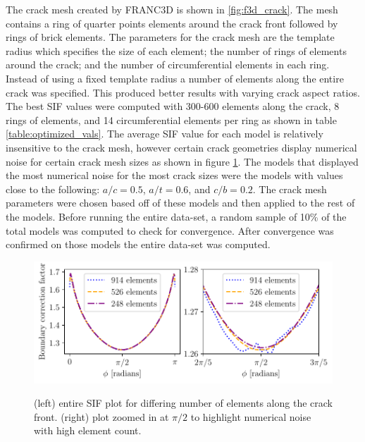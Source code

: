The crack mesh created by FRANC3D is shown in \ref{fig:f3d_crack}. The mesh contains a ring of quarter points elements around the crack front followed by rings of brick elements. The parameters for the crack mesh are the template radius which specifies the size of each element; the number of rings of elements around the crack; and the number of circumferential elements in each ring. Instead of using a fixed template radius a number of elements along the entire crack was specified. This produced better results with varying crack aspect ratios. The best SIF values were computed with 300-600 elements along the crack, 8 rings of elements, and 14 circumferential elements per ring as shown in table \ref{table:optimized_vals}. The average SIF value for each model is relatively insensitive to the crack mesh, however certain crack geometries display numerical noise for certain crack mesh sizes as shown in figure \ref{fig:crack_mesh_convergence}. The models that displayed the most numerical noise for the most crack sizes were the models with values close to the following: $a/c = 0.5$, $a/t = 0.6$, and $c/b = 0.2$. The crack mesh parameters were chosen based off of these models and then applied to the rest of the models. Before running the entire data-set, a random sample of 10\% of the total models was computed to check for convergence. After convergence was confirmed on those models the entire data-set was computed. 

\begin{figure}
    \centering
    \includegraphics[width=\textwidth]{Figures_pdf/numerical_noise.pdf}
    \label{fig:crack_mesh_convergence}
    \caption{(left) entire SIF plot for differing number of elements along the crack front. (right) plot zoomed in at $\pi/2$ to highlight numerical noise with high element count.}
\end{figure}



